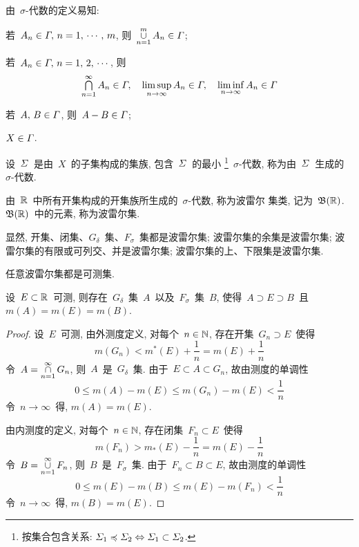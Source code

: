 由~$\sigma$-代数的定义易知:
\begin{publist}
\item[(1)] 若~$A_n \in {\mathnormal\Gamma}, \, n = 1,\,\cdots, \, m$, 则~$\mathop{\cup}
\limits_{n = 1}^m A_n \in {\mathnormal\Gamma}$;
\item[(2)] 若~$A_n \in {\mathnormal\Gamma}, \, n = 1,\,2,\,\cdots$, 则
\[
\mathop{\textstyle{\bigcap}}_{n = 1}^\infty A_n \in {\mathnormal\Gamma}, \quad \limsup_{n \to \infty} A_n \in {\mathnormal\Gamma},
\quad \liminf_{n \to \infty} A_n \in {\mathnormal\Gamma}
\]
\item[(3)] 若~$A,\,B \in {\mathnormal\Gamma}$, 则~$A - B \in {\mathnormal\Gamma}$;
\item[(4)] $X \in {\mathnormal\Gamma}$.
\end{publist}

设~${\mathnormal\Sigma}$~是由~$X$~的子集构成的集族, 包含~${\mathnormal\Sigma}$~的最小
\footnote{按集合包含关系: ${\mathnormal\Sigma}_1 \preccurlyeq {\mathnormal\Sigma}_2 \Leftrightarrow {\mathnormal\Sigma}_1
\subset {\mathnormal\Sigma}_2$. }~$\sigma$-代数, 称为由~${\mathnormal\Sigma}$~生成的~$\sigma$-代数.

由~$\mathbb{R}$~中所有开集构成的开集族所生成的~$\sigma$-代数, 称为波雷尔
集类, 记为~$\mathfrak{B}(\mathbb{R})$. $\mathfrak{B}(\mathbb{R})$~中的元素,
称为波雷尔集.

显然, 开集、闭集、$G_\delta$~集、$F_\sigma$~集都是波雷尔集; 波雷尔集的余集是波雷尔集;
波雷尔集的有限或可列交、并是波雷尔集; 波雷尔集的上、下限集是波雷尔集.

\begin{theorem}
任意波雷尔集都是可测集.
\end{theorem}

\begin{theorem} \label{thm246}
设~$E \subset \mathbb{R}$~可测, 则存在~$G_\delta$~集~$A$~以及~$F_\sigma$~集~$B$,
使得~$A \supset E \supset B$~且~$m(A) = m(E) = m(B)$.
\end{theorem}

\begin{proof}
设~$E$~可测, 由外测度定义, 对每个~$n \in \mathbb{N}$, 存在开集~$G_n \supset E$~使得
\[
m(G_n) < m^*(E) + \frac{1}{n} = m(E) + \frac{1}{n}
\]
令~$A = \mathop{\cap}\limits_{n=1}^\infty G_n$, 则~$A$~是~$G_\delta$~集. 由于~$E \subset
A \subset G_n$, 故由测度的单调性
\[
0 \leqslant m(A) - m(E) \leqslant m(G_n) - m(E) < \frac{1}{n}
\]
令~$n \to \infty$~得, $m(A) = m(E)$.

由内测度的定义, 对每个~$n \in \mathbb{N}$, 存在闭集~$F_n \subset E$~使得
\[
m(F_n) > m_*(E) - \frac{1}{n} = m(E) - \frac{1}{n}
\]
令~$B = \mathop{\cup}\limits_{n=1}^\infty F_n$, 则~$B$~是~$F_\sigma$~集. 由于~$F_n \subset
B \subset E$, 故由测度的单调性
\[
0 \leqslant m(E) - m(B) \leqslant m(E) - m(F_n) < \frac{1}{n}
\]
令~$n \to \infty$~得, $m(B) = m(E)$.
\end{proof}


